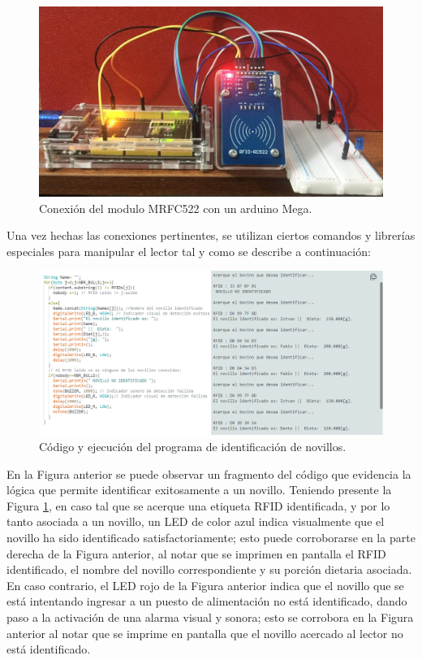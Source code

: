 \begin{figure}[H]
	\begin{center}
		\includegraphics[scale=0.30]{img/rfidconarduino.png}
	\end{center}
	\caption{Conexión del modulo MRFC522 con un arduino Mega.}\label{conexrfidpng}
\end{figure}
\pagebreak

Una vez hechas las conexiones pertinentes, se utilizan ciertos comandos y librerías especiales para manipular el lector tal y como se describe a continuación:

\begin{figure}[H]
	\begin{center}
		\includegraphics[scale=0.55]{img/cmdrfid.png}
	\end{center}
	\caption{Código y ejecución del programa de identificación de novillos.}
\end{figure}

En la Figura anterior se puede observar un fragmento del código que evidencia la lógica que permite identificar exitosamente a un novillo. Teniendo presente la Figura \ref{conexrfidpng}, en caso tal que se acerque una etiqueta RFID identificada, y por lo tanto asociada a un novillo, un LED de color azul indica visualmente que el novillo ha sido identificado satisfactoriamente; esto puede corroborarse en la parte derecha de la Figura anterior, al notar que se imprimen en pantalla el RFID identificado, el nombre del novillo correspondiente y su porción dietaria asociada. En caso contrario, el LED rojo de la Figura anterior indica que el novillo que se está intentando ingresar a un puesto de alimentación no está identificado, dando paso a la activación de una alarma visual y sonora; esto se corrobora en la Figura anterior al notar que se imprime en pantalla que el novillo acercado al lector no está identificado.

